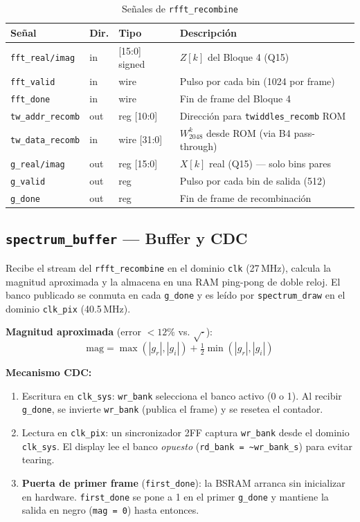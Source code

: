 \documentclass[12pt, a4paper]{article}
\begin{document}
\begin{table}[H]
\centering
\caption{Señales de \texttt{rfft\_recombine}}
\begin{tabular}{p{3cm} p{1.6cm} p{3.5cm} p{5.5cm}}
\toprule
\textbf{Señal} & \textbf{Dir.} & \textbf{Tipo} & \textbf{Descripción} \\
\midrule
\texttt{fft\_real/imag} & in  & [15:0] signed & $Z[k]$ del Bloque 4 (Q15) \\
\texttt{fft\_valid}     & in  & wire         & Pulso por cada bin (1024 por frame) \\
\texttt{fft\_done}      & in  & wire         & Fin de frame del Bloque 4 \\
\texttt{tw\_addr\_recomb}& out & reg [10:0]   & Dirección para \texttt{twiddles\_recomb} ROM \\
\texttt{tw\_data\_recomb}& in  & wire [31:0]  & $W_{2048}^k$ desde ROM (via B4 pass-through) \\
\texttt{g\_real/imag}   & out & reg [15:0]   & $X[k]$ real (Q15) — solo bins pares \\
\texttt{g\_valid}       & out & reg          & Pulso por cada bin de salida (512) \\
\texttt{g\_done}        & out & reg          & Fin de frame de recombinación \\
\bottomrule
\end{tabular}
\end{table}

\subsection{\texttt{spectrum\_buffer} — Buffer y CDC}

Recibe el stream del \texttt{rfft\_recombine} en el dominio \texttt{clk}
(27\,MHz), calcula la magnitud aproximada y la almacena en una RAM ping-pong
de doble reloj. El banco publicado se conmuta en cada \texttt{g\_done} y es
leído por \texttt{spectrum\_draw} en el dominio \texttt{clk\_pix} (40.5\,MHz).

\textbf{Magnitud aproximada} (error $<12\%$ vs. $\sqrt{\cdot}$):
\[
\text{mag} = \max(|g_r|, |g_i|) + \tfrac{1}{2}\min(|g_r|, |g_i|)
\]

\textbf{Mecanismo CDC:}
\begin{enumerate}[leftmargin=*]
    \item Escritura en \texttt{clk\_sys}: \texttt{wr\_bank} selecciona el
          banco activo (0 o 1). Al recibir \texttt{g\_done}, se invierte
          \texttt{wr\_bank} (publica el frame) y se resetea el contador.
    \item Lectura en \texttt{clk\_pix}: un sincronizador 2FF captura
          \texttt{wr\_bank} desde el dominio \texttt{clk\_sys}. El display
          lee el banco \emph{opuesto} (\texttt{rd\_bank = \textasciitilde wr\_bank\_s})
          para evitar tearing.
    \item \textbf{Puerta de primer frame} (\texttt{first\_done}): la BSRAM
          arranca sin inicializar en hardware. \texttt{first\_done} se pone a 1
          en el primer \texttt{g\_done} y mantiene la salida en negro
          (\texttt{mag = 0}) hasta entonces.
\end{enumerate}
\end{document}
